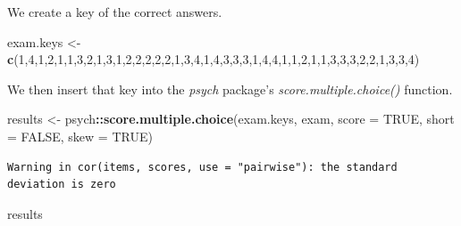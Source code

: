 \documentclass[
  english,
]{book}
\newenvironment{Shaded}{\begin{snugshade}}{\end{snugshade}}
\newcommand{\DataTypeTok}[1]{\textcolor[rgb]{0.13,0.29,0.53}{#1}}
\newcommand{\DecValTok}[1]{\textcolor[rgb]{0.00,0.00,0.81}{#1}}
\newcommand{\KeywordTok}[1]{\textcolor[rgb]{0.13,0.29,0.53}{\textbf{#1}}}
\newcommand{\NormalTok}[1]{#1}
\newcommand{\OperatorTok}[1]{\textcolor[rgb]{0.81,0.36,0.00}{\textbf{#1}}}
\newcommand{\OtherTok}[1]{\textcolor[rgb]{0.56,0.35,0.01}{#1}}
\newcommand{\StringTok}[1]{\textcolor[rgb]{0.31,0.60,0.02}{#1}}
\begin{document}
We create a key of the correct answers.

\begin{Shaded}
\begin{Highlighting}[]
\NormalTok{exam.keys <-}\StringTok{ }\KeywordTok{c}\NormalTok{(}\DecValTok{1}\NormalTok{,}\DecValTok{4}\NormalTok{,}\DecValTok{1}\NormalTok{,}\DecValTok{2}\NormalTok{,}\DecValTok{1}\NormalTok{,}\DecValTok{1}\NormalTok{,}\DecValTok{3}\NormalTok{,}\DecValTok{2}\NormalTok{,}\DecValTok{1}\NormalTok{,}\DecValTok{3}\NormalTok{,}\DecValTok{1}\NormalTok{,}\DecValTok{2}\NormalTok{,}\DecValTok{2}\NormalTok{,}\DecValTok{2}\NormalTok{,}\DecValTok{2}\NormalTok{,}\DecValTok{2}\NormalTok{,}\DecValTok{1}\NormalTok{,}\DecValTok{3}\NormalTok{,}\DecValTok{4}\NormalTok{,}\DecValTok{1}\NormalTok{,}\DecValTok{4}\NormalTok{,}\DecValTok{3}\NormalTok{,}\DecValTok{3}\NormalTok{,}\DecValTok{3}\NormalTok{,}\DecValTok{1}\NormalTok{,}\DecValTok{4}\NormalTok{,}\DecValTok{4}\NormalTok{,}\DecValTok{1}\NormalTok{,}\DecValTok{1}\NormalTok{,}\DecValTok{2}\NormalTok{,}\DecValTok{1}\NormalTok{,}\DecValTok{1}\NormalTok{,}\DecValTok{3}\NormalTok{,}\DecValTok{3}\NormalTok{,}\DecValTok{3}\NormalTok{,}\DecValTok{2}\NormalTok{,}\DecValTok{2}\NormalTok{,}\DecValTok{1}\NormalTok{,}\DecValTok{3}\NormalTok{,}\DecValTok{3}\NormalTok{,}\DecValTok{4}\NormalTok{)  }
\end{Highlighting}
\end{Shaded}

We then insert that key into the \emph{psych} package's \emph{score.multiple.choice()} function.

\begin{Shaded}
\begin{Highlighting}[]
\NormalTok{results <-}\StringTok{ }\NormalTok{psych}\OperatorTok{::}\KeywordTok{score.multiple.choice}\NormalTok{(exam.keys, exam, }\DataTypeTok{score =} \OtherTok{TRUE}\NormalTok{, }\DataTypeTok{short =} \OtherTok{FALSE}\NormalTok{, }\DataTypeTok{skew =} \OtherTok{TRUE}\NormalTok{)}
\end{Highlighting}
\end{Shaded}

\begin{verbatim}
Warning in cor(items, scores, use = "pairwise"): the standard deviation is zero
\end{verbatim}

\begin{Shaded}
\begin{Highlighting}[]
\NormalTok{results}
\end{Highlighting}
\end{Shaded}
\end{document}
